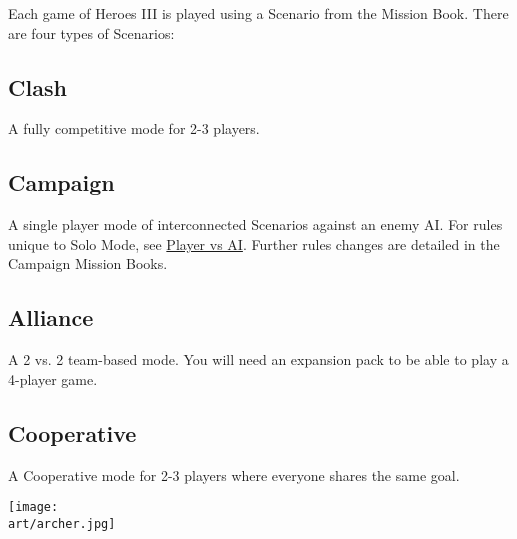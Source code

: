 
\begin{multicols*}{2}

Each game of Heroes III is played using a Scenario from the Mission Book.
There are four types of Scenarios:

\subsection*{Clash}
A fully competitive mode for 2-3 players.

\subsection*{Campaign}
A single player mode of interconnected Scenarios against an enemy AI.
For rules unique to Solo Mode, see \hyperlink{AIrules}{Player vs AI}.
Further rules changes are detailed in the Campaign Mission Books.

\subsection*{Alliance}
A 2 vs. 2 team-based mode.
You will need an expansion pack to be able to play a 4-player game.

\subsection*{Cooperative}
A Cooperative mode for 2-3 players where everyone shares the same goal.

\vspace*{\fill}

\columnbreak

\texttt{[image: \\art/archer.jpg]}

\end{multicols*}
